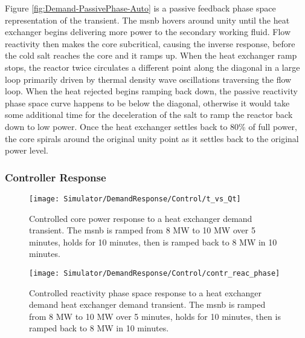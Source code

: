 Figure \ref{fig:Demand-PassivePhase-Auto} is a passive feedback phase space representation of the transient. The \acs{msnb} hovers around unity until the heat exchanger begins delivering more power to the secondary working fluid. Flow reactivity then makes the core subcritical, causing the inverse response, before the cold salt reaches the core and it ramps up. When the heat exchanger ramp stops, the reactor twice circulates a different point along the diagonal in a large loop primarily driven by thermal density wave oscillations traversing the flow loop. When the heat rejected begins ramping back down, the passive reactivity phase space curve happens to be below the diagonal, otherwise it would take some additional time for the deceleration of the salt to ramp the reactor back down to low power. Once the heat exchanger settles back to 80\% of full power, the core spirals around the original unity point as it settles back to the original power level.

\subsubsection{Controller Response}
\begin{figure}[ht!]
    \centering
    \texttt{[image: Simulator/DemandResponse/Control/t\_vs\_Qt]}
    \caption[Controlled Demand-Response Power Response ]{Controlled core power response to a heat exchanger demand transient. The \acs{msnb} is ramped from 8 MW to 10 MW over 5 minutes, holds for 10 minutes, then is ramped back to 8 MW in 10 minutes.}
    \label{fig:Demand-Power-Ctr}
\end{figure}

\begin{figure}[ht!]
    \centering
    \texttt{[image: Simulator/DemandResponse/Control/contr\_reac\_phase]}
    \caption[Controlled Demand-Response Reactivity Phase Space]{Controlled reactivity phase space response to a heat exchanger demand heat exchanger demand transient. The \acs{msnb} is ramped from 8 MW to 10 MW over 5 minutes, holds for 10 minutes, then is ramped back to 8 MW in 10 minutes.}
    \label{fig:Demand-ControlPhase-Ctr}
\end{figure}
\clearpage